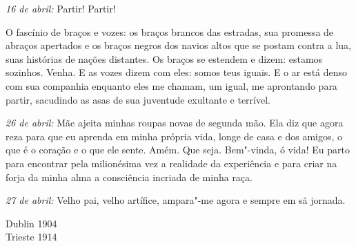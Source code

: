 \medskip\noindent\textit{16 de abril:} Partir! Partir!

O fascínio de braços e vozes: os braços brancos das estradas, sua
promessa de abraços apertados e os braços negros dos navios altos que
se postam contra a lua, suas histórias de nações distantes. Os braços
se estendem e dizem: estamos sozinhos. Venha. E as vozes dizem com
eles: somos teus iguais. E o ar está denso com sua companhia enquanto
eles me chamam, um igual, me aprontando para partir, sacudindo as asas
de sua juventude exultante e terrível.

\medskip\noindent\textit{26 de abril:} Mãe ajeita minhas roupas novas de segunda mão.
Ela diz que agora reza para que eu aprenda em minha própria
vida, longe de casa e dos amigos, o que é o coração e o que ele sente.
Amém. Que seja. Bem"-vinda, ó vida! Eu parto para encontrar pela
milionésima vez a realidade da experiência e para criar na forja da
minha alma a consciência incriada de minha raça.

\medskip\noindent\textit{27 de abril:} Velho pai, velho artífice, ampara"-me agora e
sempre em sã jornada.		

\vspace*{3em}

{\raggedleft
Dublin 1904\\
Trieste 1914
\par}



